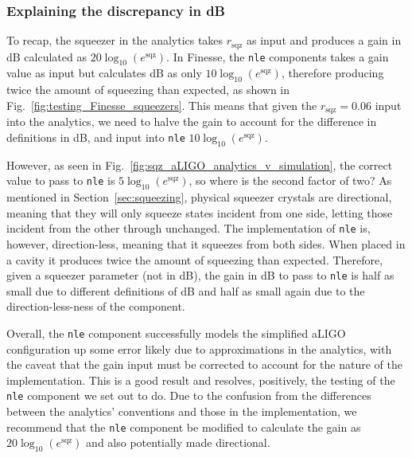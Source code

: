 \documentclass[aps,pra,superscriptaddress,reprint,nofootinbib]{revtex4-1}
\newcommand{\code}[1]{\texttt{#1}}
\begin{document}
\subsubsection{Explaining the discrepancy in dB}

To recap, the squeezer in the analytics takes $r_\mathrm{sqz}$ as input and produces a gain in dB calculated as $20 \log_{10}(e^\mathrm{sqz})$. In Finesse, the \code{nle} components takes a gain value as input but calculates dB as only $10 \log_{10}(e^\mathrm{sqz})$, therefore producing twice the amount of squeezing than expected, as shown in Fig.~\ref{fig:testing_Finesse_squeezers}. This means that given the $r_\mathrm{sqz} = 0.06$ input into the analytics, we need to halve the gain to account for the difference in definitions in dB, and input into \code{nle} $10 \log_{10}(e^\mathrm{sqz})$.


However, as seen in Fig.~\ref{fig:sqz_aLIGO_analytics_v_simulation}, the correct value to pass to \code{nle} is $5 \log_{10}(e^\mathrm{sqz})$, so where is the second factor of two? As mentioned in Section~\ref{sec:squeezing}, physical squeezer crystals are directional, meaning that they will only squeeze states incident from one side, letting those incident from the other through unchanged. The implementation of \code{nle} is, however, direction-less, meaning that it squeezes from both sides. When placed in a cavity it produces twice the amount of squeezing than expected. Therefore, given a squeezer parameter (not in dB), the gain in dB to pass to \code{nle} is half as small due to different definitions of dB and half as small again due to the direction-less-ness of the component.


Overall, the \code{nle} component successfully models the simplified aLIGO configuration up some error likely due to approximations in the analytics, with the caveat that the gain input must be corrected to account for the nature of the implementation. This is a good result and resolves, positively, the testing of the \code{nle} component we set out to do. Due to the confusion from the differences between the analytics’ conventions and those in the implementation, we recommend that the \code{nle} component be modified to calculate the gain as $20 \log_{10}(e^\mathrm{sqz})$ and also potentially made directional.
\end{document}
